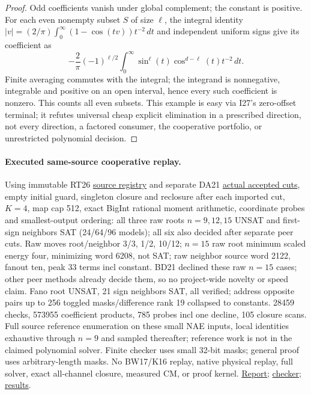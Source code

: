 \documentclass[11pt]{article}
\begin{document}
\begin{proof}
Odd coefficients vanish under global complement; the constant is positive. For each even nonempty subset $S$ of size $\ell$, the integral identity $|v|=(2/\pi)\int_0^\infty(1-\cos(tv))t^{-2}\,dt$ and independent uniform signs give its coefficient as
\[
-\frac{2}{\pi}(-1)^{\ell/2}\int_0^\infty \sin^\ell(t)\cos^{d-\ell}(t)t^{-2}\,dt .
\]
Finite averaging commutes with the integral; the integrand is nonnegative, integrable and positive on an open interval, hence every such coefficient is nonzero. This counts all even subsets. This example is easy via I27's zero-offset terminal; it refutes universal cheap explicit elimination in a prescribed direction, not every direction, a factored consumer, the cooperative portfolio, or unrestricted polynomial decision.
\end{proof}
\paragraph{Executed same-source cooperative replay.}
Using immutable RT26 \href{https://github.com/j15marti/pnp/commit/85e959ac861572a2411b9858da0d58d7c72ac780}{source registry} and separate DA21 \href{https://github.com/j15marti/pnp/commit/6d9917749c8438435d889b31e5c81ed0fc410e9a}{actual accepted cuts}, empty initial guard, singleton closure and reclosure after each imported cut, $K=4$, map cap 512, exact BigInt rational moment arithmetic, coordinate probes and smallest-output ordering: all three raw roots $n=9,12,15$ UNSAT and first-sign neighbors SAT (24/64/96 models); all six also decided after separate peer cuts. Raw moves root/neighbor 3/3, 1/2, 10/12; $n=15$ raw root minimum scaled energy four, minimizing word 6208, not SAT; raw neighbor source word 2122, fanout ten, peak 33 terms incl constant. BD21 declined these raw $n=15$ cases; other peer methods already decide them, so no project-wide novelty or speed claim. Fano root UNSAT, 21 sign neighbors SAT, all verified; address opposite pairs up to 256 toggled masks/difference rank 19 collapsed to constants. 28459 checks, 573955 coefficient products, 785 probes incl one decline, 105 closure scans. Full source reference enumeration on these small NAE inputs, local identities exhaustive through $n=9$ and sampled thereafter; reference work is not in the claimed polynomial solver. Finite checker uses small 32-bit masks; general proof uses arbitrary-length masks. No BW17/K16 replay, native physical replay, full solver, exact all-channel closure, measured CM, or proof kernel. \href{https://github.com/j15marti/pnp/commit/0c6d6bd72354316a9c47151c01c7820f94642443}{Report}; \href{https://github.com/j15marti/pnp/commit/b070114b8524010ac847eabe382d4cfa50071353}{checker}; \href{https://github.com/j15marti/pnp/commit/4e2d32abdf4ab034a8b71cb06e98670e0bc78e6b}{results}.
\end{document}
